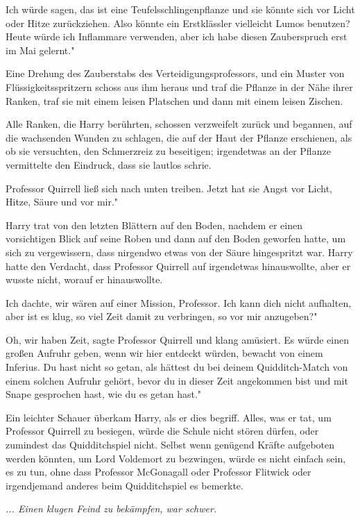 \glqq{}Ich würde sagen, das ist eine Teufelsschlingenpflanze und sie könnte sich
vor Licht oder Hitze zurückziehen. Also könnte ein Erstklässler vielleicht Lumos
benutzen? Heute würde ich Inflammare verwenden, aber ich habe diesen
Zauberspruch erst im Mai gelernt."

Eine Drehung des Zauberstabs des Verteidigungsprofessors, und ein Muster von
Flüssigkeitsspritzern schoss aus ihm heraus und traf die Pflanze in der Nähe
ihrer Ranken, traf sie mit einem leisen Platschen und dann mit einem leisen
Zischen.

Alle Ranken, die Harry berührten, schossen verzweifelt zurück und begannen, auf
die wachsenden Wunden zu schlagen, die auf der Haut der Pflanze erschienen, als
ob sie versuchten, den Schmerzreiz zu beseitigen; irgendetwas an der Pflanze
vermittelte den Eindruck, dass sie lautlos schrie.

Professor Quirrell ließ sich nach unten treiben. \glqq{}Jetzt hat sie Angst vor
Licht, Hitze, Säure und vor mir."

Harry trat von den letzten Blättern auf den Boden, nachdem er einen vorsichtigen
Blick auf seine Roben und dann auf den Boden geworfen hatte, um sich zu
vergewissern, dass nirgendwo etwas von der Säure hingespritzt war. Harry hatte
den Verdacht, dass Professor Quirrell auf irgendetwas hinauswollte, aber er
wusste nicht, worauf er hinauswollte.

\glqq{}Ich dachte, wir wären auf einer Mission, Professor. Ich kann dich nicht
aufhalten, aber ist es klug, so viel Zeit damit zu verbringen, so vor mir
anzugeben?"

\glqq{}Oh, wir haben Zeit\grqq{}, sagte Professor Quirrell und klang amüsiert.
\glqq{}Es würde einen großen Aufruhr geben, wenn wir hier entdeckt würden,
bewacht von einem Inferius. Du hast nicht so getan, als hättest du bei deinem
Quidditch-Match von einem solchen Aufruhr gehört, bevor du in dieser Zeit
angekommen bist und mit Snape gesprochen hast, wie du es getan hast."

Ein leichter Schauer überkam Harry, als er dies begriff. Alles, was er tat, um
Professor Quirrell zu besiegen, würde die Schule nicht stören dürfen, oder
zumindest das Quidditchspiel nicht. Selbst wenn genügend Kräfte aufgeboten
werden könnten, um Lord Voldemort zu bezwingen, würde es nicht einfach sein, es
zu tun, ohne dass Professor McGonagall oder Professor Flitwick oder irgendjemand
anderes beim Quidditchspiel es bemerkte.

\emph{... Einen klugen Feind zu bekämpfen, war schwer.}

